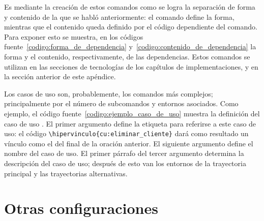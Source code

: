 
Es mediante la creación de estos comandos como se logra la separación de forma
y contenido de la que se habló anteriormente: el comando define la forma,
mientras que el contenido queda definido por el código dependiente del comando.
Para exponer esto se muestra, en los códigos
fuente~\ref{codigo:forma_de_dependencia} y~\ref{codigo:contenido_de_dependencia}
la forma y el contenido, respectivamente, de las dependencias. Estos comandos
se utilizan en las secciones de tecnologías de los capítulos de
implementaciones, y en la sección anterior de este apéndice.



Los casos de uso son, probablemente, los comandos más complejos; principalmente
por el número de subcomandos y entornos asociados. Como ejemplo, el código
fuente~\ref{codigo:ejemplo_caso_de_uso} muestra la definición del caso de uso
. El primer argumento define la etiqueta para
referirse a este caso de uso: el código
\verb|\hipervinculo{cu:eliminar_cliente}| dará como resultado un vínculo como
el del final de la oración anterior. El siguiente argumento define el nombre
del caso de uso. El primer párrafo del tercer argumento determina la
descripción del caso de uso; después de esto van los entornos de la trayectoria
principal y las trayectorias alternativas.


\section{Otras configuraciones}

